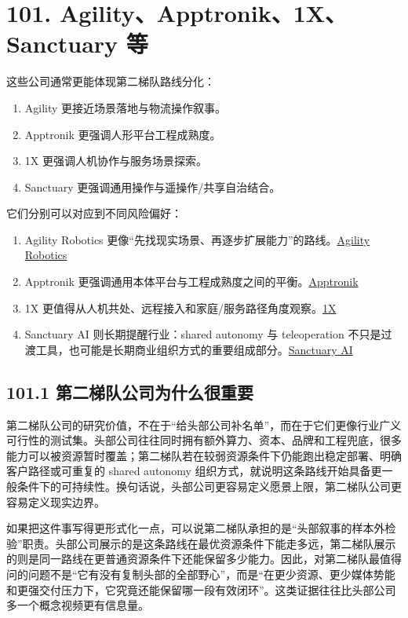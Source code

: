 \chapter*{101. Agility、Apptronik、1X、Sanctuary 等}

这些公司通常更能体现第二梯队路线分化：

\begin{enumerate}
\item Agility 更接近场景落地与物流操作叙事。
\item Apptronik 更强调人形平台工程成熟度。
\item 1X 更强调人机协作与服务场景探索。
\item Sanctuary 更强调通用操作与遥操作/共享自治结合。
\end{enumerate}

它们分别可以对应到不同风险偏好：

\begin{enumerate}
\item Agility Robotics 更像“先找现实场景、再逐步扩展能力”的路线。\href{https://agilityrobotics.com/}{Agility Robotics}
\item Apptronik 更强调通用本体平台与工程成熟度之间的平衡。\href{https://apptronik.com/}{Apptronik}
\item 1X 更值得从人机共处、远程接入和家庭/服务路径角度观察。\href{https://www.1x.tech/}{1X}
\item Sanctuary AI 则长期提醒行业：shared autonomy 与 teleoperation 不只是过渡工具，也可能是长期商业组织方式的重要组成部分。\href{https://www.sanctuary.ai/}{Sanctuary AI}
\end{enumerate}

\section*{101.1 第二梯队公司为什么很重要}


第二梯队公司的研究价值，不在于“给头部公司补名单”，而在于它们更像行业广义可行性的测试集。头部公司往往同时拥有额外算力、资本、品牌和工程兜底，很多能力可以被资源暂时覆盖；第二梯队若在较弱资源条件下仍能跑出稳定部署、明确客户路径或可重复的 shared autonomy 组织方式，就说明这条路线开始具备更一般条件下的可持续性。换句话说，头部公司更容易定义愿景上限，第二梯队公司更容易定义现实边界。

如果把这件事写得更形式化一点，可以说第二梯队承担的是“头部叙事的样本外检验”职责。头部公司展示的是这条路线在最优资源条件下能走多远，第二梯队展示的则是同一路线在更普通资源条件下还能保留多少能力。因此，对第二梯队最值得问的问题不是“它有没有复制头部的全部野心”，而是“在更少资源、更少媒体势能和更强交付压力下，它究竟还能保留哪一段有效闭环”。这类证据往往比头部公司多一个概念视频更有信息量。


